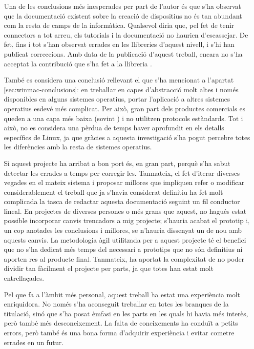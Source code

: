 Una de les conclusions més inesperades per part de l'autor és que s'ha
observat que la documentació existent sobre la creació de dispositius
 no és tan abundant com la resta de camps de la informàtica.
Qualsevol diria que, pel fet de tenir connectors  a tot arreu,
els tutorials i la documentació no haurien d'escassejar. De
fet, fins i tot s'han observat errades en les llibreries d'aquest nivell, i s'hi
han publicat correccions. Amb data de la publicació d'aquest treball, encara
no s'ha acceptat la contribució que s'ha fet a la llibreria .

També es considera una conclusió rellevant el que s'ha mencionat a l'apartat
\ref{sec:winmac-conclusions}: en treballar en capes d'abstracció molt altes i
només disponibles en alguns sistemes operatius, portar l'aplicació a altres
sistemes operatius esdevé més complicat. Per això, gran part dels productes
comercials es queden a una capa més baixa (sovint ) i no utilitzen
protocols  estàndards. Tot i això, no es considera una pèrdua de temps
haver aprofundit en els detalls específics de Linux, ja que gràcies a aquesta
investigació s'ha pogut percebre totes les diferències amb la resta de sistemes
operatius.

Si aquest projecte ha arribat a bon port és, en gran part, perquè s'ha sabut
detectar les errades a temps per corregir-les. Tanmateix, el fet d'iterar
diverses vegades en el mateix sistema i proposar millores que
impliquen refer o modificar considerablement el treball que ja s'havia
considerat definitiu ha fet molt complicada la tasca de redactar aquesta
documentació seguint un fil conductor lineal. En projectes de diverses persones
o més grans que aquest, no hagués estat possible incorporar canvis trencadors
a mig projecte; s'hauria acabat el prototip i, un cop anotades les conclusions
i millores, se n'hauria dissenyat un de nou amb aquests canvis. La metodologia
àgil utilitzada per a aquest projecte té el benefici que no s'ha dedicat més
temps del necessari a prototips que no són definitius ni aporten res al
producte final. Tanmateix, ha aportat la complexitat de no poder dividir tan
fàcilment el projecte per parts, ja que totes han estat molt entrellaçades.

Pel que fa a l'àmbit més personal, aquest treball ha estat una experiència molt
enriquidora. No només s'ha aconseguit treballar en totes les branques de la
titulació, sinó que s'ha posat èmfasi en les parts en les quals hi havia més
interès, però també més desconeixement. La falta de coneixements ha conduït a
petits errors, però també és una bona forma d'adquirir experiència i evitar
cometre errades en un futur.
